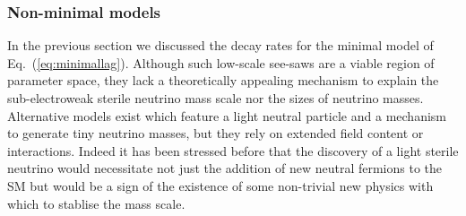 \documentclass[11pt, a4paper]{article}
\newcommand{\refeq}[1]{Eq.~(\ref{#1})}
\def\ster{\ensuremath N}
\begin{document}
\subsubsection{\label{sec:nonminimal}Non-minimal models}


In the previous section we discussed the decay rates for the minimal model of
\refeq{eq:minimallag}. Although such low-scale see-saws are a viable region of
parameter space, they lack a theoretically appealing mechanism to explain the
sub-electroweak sterile neutrino mass scale nor the sizes of neutrino masses.
Alternative models exist which feature a light neutral particle and a mechanism
to generate tiny neutrino masses, but they rely on extended field content or
interactions.
%
Indeed it has been stressed before \cite{delAguila:2008ir} that the discovery
of a light sterile neutrino would necessitate not just the addition of new
neutral fermions to the SM but would be a sign of the existence of some
non-trivial new physics with which to stablise the mass scale.
 
\end{document}
